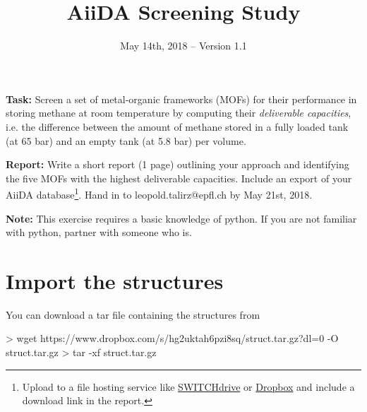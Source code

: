 \documentclass[twoside,a4paper,11pt]{extarticle}
\title{AiiDA Screening Study}
\date{May 14th, 2018 -- Version 1.1}
\begin{document}
\maketitle


\textbf{Task:} Screen a set of metal-organic frameworks (MOFs) for their performance in storing methane at room temperature
by computing their \textit{deliverable capacities}, i.e. the difference between the amount of methane stored in a fully loaded tank (at 65 bar) and an empty tank (at 5.8 bar) per volume. 

\textbf{Report:} Write a short report (1 page)
outlining your approach and identifying the five MOFs with the highest deliverable capacities.
Include an export of your AiiDA database\footnote{Upload to a file hosting service
like \href{https://drive.switch.ch/}{SWITCHdrive} or \href{https://www.dropbox.com/}{Dropbox} and include a download link in the report.}.
Hand in to leopold.talirz@epfl.ch by May 21st, 2018.

\textbf{Note:} This exercise requires a basic knowledge of python.
If you are not familiar with python, partner with someone who is.

\section{Import the structures}
You can download a tar file containing the structures from
\begin{bashcommand}
> wget https://www.dropbox.com/s/hg2uktah6pzi8sq/struct.tar.gz?dl=0 -O struct.tar.gz
> tar -xf struct.tar.gz
\end{bashcommand}
\end{document}

